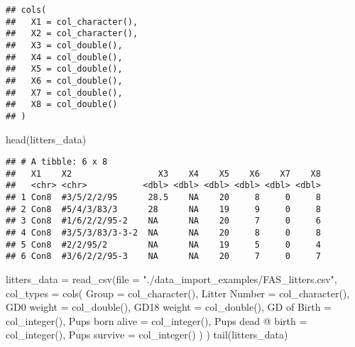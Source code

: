 \documentclass[
]{article}
\newenvironment{Shaded}{\begin{snugshade}}{\end{snugshade}}
\newcommand{\AttributeTok}[1]{\textcolor[rgb]{0.77,0.63,0.00}{#1}}
\newcommand{\FunctionTok}[1]{\textcolor[rgb]{0.00,0.00,0.00}{#1}}
\newcommand{\NormalTok}[1]{#1}
\newcommand{\OtherTok}[1]{\textcolor[rgb]{0.56,0.35,0.01}{#1}}
\newcommand{\StringTok}[1]{\textcolor[rgb]{0.31,0.60,0.02}{#1}}
\begin{document}
\begin{verbatim}
## cols(
##   X1 = col_character(),
##   X2 = col_character(),
##   X3 = col_double(),
##   X4 = col_double(),
##   X5 = col_double(),
##   X6 = col_double(),
##   X7 = col_double(),
##   X8 = col_double()
## )
\end{verbatim}

\begin{Shaded}
\begin{Highlighting}[]
\FunctionTok{head}\NormalTok{(litters\_data)}
\end{Highlighting}
\end{Shaded}

\begin{verbatim}
## # A tibble: 6 x 8
##   X1    X2                 X3    X4    X5    X6    X7    X8
##   <chr> <chr>           <dbl> <dbl> <dbl> <dbl> <dbl> <dbl>
## 1 Con8  #3/5/2/2/95      28.5    NA    20     8     0     8
## 2 Con8  #5/4/3/83/3      28      NA    19     9     0     8
## 3 Con8  #1/6/2/2/95-2    NA      NA    20     7     0     6
## 4 Con8  #3/5/3/83/3-3-2  NA      NA    20     8     0     8
## 5 Con8  #2/2/95/2        NA      NA    19     5     0     4
## 6 Con8  #3/6/2/2/95-3    NA      NA    20     7     0     7
\end{verbatim}

\begin{Shaded}
\begin{Highlighting}[]
\NormalTok{litters\_data }\OtherTok{=} \FunctionTok{read\_csv}\NormalTok{(}\AttributeTok{file =} \StringTok{"./data\_import\_examples/FAS\_litters.csv"}\NormalTok{,}
  \AttributeTok{col\_types =} \FunctionTok{cols}\NormalTok{(}
    \AttributeTok{Group =} \FunctionTok{col\_character}\NormalTok{(),}
    \StringTok{\textasciigrave{}}\AttributeTok{Litter Number}\StringTok{\textasciigrave{}} \OtherTok{=} \FunctionTok{col\_character}\NormalTok{(),}
    \StringTok{\textasciigrave{}}\AttributeTok{GD0 weight}\StringTok{\textasciigrave{}} \OtherTok{=} \FunctionTok{col\_double}\NormalTok{(),}
    \StringTok{\textasciigrave{}}\AttributeTok{GD18 weight}\StringTok{\textasciigrave{}} \OtherTok{=} \FunctionTok{col\_double}\NormalTok{(),}
    \StringTok{\textasciigrave{}}\AttributeTok{GD of Birth}\StringTok{\textasciigrave{}} \OtherTok{=} \FunctionTok{col\_integer}\NormalTok{(),}
    \StringTok{\textasciigrave{}}\AttributeTok{Pups born alive}\StringTok{\textasciigrave{}} \OtherTok{=} \FunctionTok{col\_integer}\NormalTok{(),}
    \StringTok{\textasciigrave{}}\AttributeTok{Pups dead @ birth}\StringTok{\textasciigrave{}} \OtherTok{=} \FunctionTok{col\_integer}\NormalTok{(),}
    \StringTok{\textasciigrave{}}\AttributeTok{Pups survive}\StringTok{\textasciigrave{}} \OtherTok{=} \FunctionTok{col\_integer}\NormalTok{()}
\NormalTok{  )}
\NormalTok{)}
\FunctionTok{tail}\NormalTok{(litters\_data)}
\end{Highlighting}
\end{Shaded}
\end{document}
